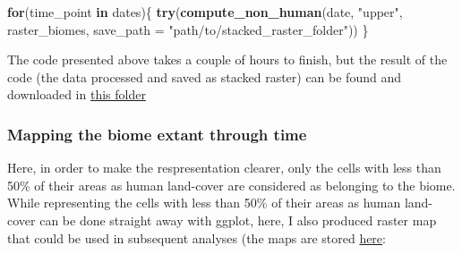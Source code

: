 \documentclass[]{article}
\newenvironment{Shaded}{\begin{snugshade}}{\end{snugshade}}
\newcommand{\KeywordTok}[1]{\textcolor[rgb]{0.13,0.29,0.53}{\textbf{#1}}}
\newcommand{\DataTypeTok}[1]{\textcolor[rgb]{0.13,0.29,0.53}{#1}}
\newcommand{\StringTok}[1]{\textcolor[rgb]{0.31,0.60,0.02}{#1}}
\newcommand{\ControlFlowTok}[1]{\textcolor[rgb]{0.13,0.29,0.53}{\textbf{#1}}}
\newcommand{\NormalTok}[1]{#1}
\begin{document}
\begin{Shaded}
\begin{Highlighting}[]
\ControlFlowTok{for}\NormalTok{(time_point }\ControlFlowTok{in}\NormalTok{ dates)\{}
        \KeywordTok{try}\NormalTok{(}\KeywordTok{compute_non_human}\NormalTok{(date, }\StringTok{"upper"}\NormalTok{, }
\NormalTok{                      raster_biomes, }
                      \DataTypeTok{save_path =} \StringTok{"path/to/stacked_raster_folder"}\NormalTok{))}
\NormalTok{\}}
\end{Highlighting}
\end{Shaded}

The code presented above takes a couple of hours to finish, but the
result of the code (the data processed and saved as stacked raster) can
be found and downloaded in \href{https://goo.gl/aHhtGx}{this folder}

\subsubsection{Mapping the biome extant through
time}\label{mapping-the-biome-extant-through-time}

Here, in order to make the respresentation clearer, only the cells with
less than 50\% of their areas as human land-cover are considered as
belonging to the biome. While representing the cells with less than 50\%
of their areas as human land-cover can be done straight away with
ggplot, here, I also produced raster map that could be used in
subsequent analyses (the maps are stored \href{}{here}:
\end{document}
